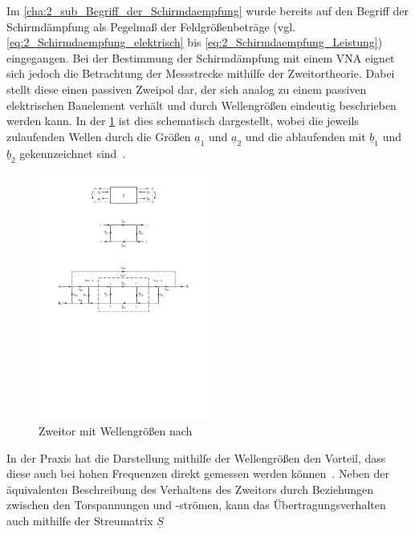

Im \Abschnitt\ref{cha:2_sub_Begriff_der_Schirmdaempfung} wurde bereits auf den Begriff der Schirmdämpfung als Pegelmaß der Feldgrößen\-beträge (vgl. \Gleichungen\eqref{eq:2_Schirmdaempfung_elektrisch} bis \eqref{eq:2_Schirmdaempfung_Leistung}) eingegangen. Bei der Bestimmung der Schirmdämpfung mit einem VNA eignet sich jedoch die Betrachtung der Messstrecke mithilfe der Zweitortheorie. Dabei stellt diese einen passiven Zweipol dar, der sich analog zu einem passiven elektrischen Bauelement verhält und durch Wellengrößen eindeutig beschrieben werden kann. In der \Abb\ref{fig:4_Zweitor} ist dies schematisch dargestellt, wobei die jeweils zulaufenden Wellen durch die Größen $\underline{a}_1$ und $\underline{a}_2$ und die ablaufenden mit $\underline{b}_1$ und $\underline{b}_2$ gekennzeichnet sind~\cite{Taschenbuch_HF-Technik}. 
\par
\vspace{\linespace}


\begin{figure}[ht]
    \centering
    \includegraphics[page = 1, trim = 5.9cm 24cm 5.9cm 1.3cm, clip, width = 0.5\textwidth]{Abbildungen/Kapitel4/Zweitor.pdf}
    \caption[Zweitor mit Wellengrößen]{Zweitor mit Wellengrößen nach~\cite{Taschenbuch_HF-Technik}}
    \label{fig:4_Zweitor}
\end{figure}


In der Praxis hat die Darstellung mithilfe der Wellengrößen den Vorteil, dass diese auch bei hohen \mbox{Frequenzen} direkt gemessen werden können~\cite{Taschenbuch_HF-Technik}. Neben der äquivalenten Beschreibung des Verhaltens des Zweitors durch Beziehungen zwischen den Torspannungen und -strömen, kann das Übertragungsverhalten auch mithilfe der Streumatrix $\underline{S}$ 


